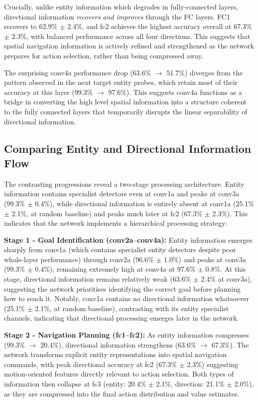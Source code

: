Crucially, unlike entity information which degrades in fully-connected layers, directional information \textit{recovers and improves} through the FC layers. FC1 recovers to 62.9\% $\pm$ 2.4\%, and fc2 achieves the highest accuracy overall at 67.3\% $\pm$ 2.3\%, with balanced performance across all four directions. This suggests that spatial navigation information is actively refined and strengthened as the network prepares for action selection, rather than being compressed away.

The surprising conv4a performance drop (63.6\% $\rightarrow$ 51.7\%) diverges from the pattern observed in the next target entity probes, which retain most of their accuracy at this layer (99.3\% $\rightarrow$ 97.6\%). This suggests conv4a functions as a bridge in converting the high level spatial information into a structure coherent to the fully connected layers that temporarily disrupts the linear separability of directional information.

\subsection{Comparing Entity and Directional Information Flow}

The contrasting progressions reveal a two-stage processing architecture. Entity information contains specialist detectors even at conv1a and peaks at conv3a (99.3\% $\pm$ 0.4\%), while directional information is entirely absent at conv1a (25.1\% $\pm$ 2.1\%, at random baseline) and peaks much later at fc2 (67.3\% $\pm$ 2.3\%). This indicates that the network implements a hierarchical processing strategy:

\textbf{Stage 1 - Goal Identification (conv2a--conv4a):} Entity information emerges sharply from conv1a (which contains specialist entity detectors despite poor whole-layer performance) through conv2a (96.6\% $\pm$ 1.0\%) and peaks at conv3a (99.3\% $\pm$ 0.4\%), remaining extremely high at conv4a at 97.6\% $\pm$ 0.8\%. At this stage, directional information remains relatively weak (63.6\% $\pm$ 2.4\% at conv3a), suggesting the network prioritises identifying the correct goal before planning how to reach it. Notably, conv1a contains no directional information whatsoever (25.1\% $\pm$ 2.1\%, at random baseline), contrasting with its entity specialist channels, indicating that directional processing emerges later in the network.

\textbf{Stage 2 - Navigation Planning (fc1--fc2):} As entity information compresses (99.3\% $\rightarrow$ 20.4\%), directional information strengthens (63.6\% $\rightarrow$ 67.3\%). The network transforms explicit entity representations into spatial navigation commands, with peak directional accuracy at fc2 (67.3\% $\pm$ 2.3\%) suggesting motion-oriented features directly relevant to action selection. Both types of information then collapse at fc3 (entity: 20.4\% $\pm$ 2.1\%, direction: 21.1\% $\pm$ 2.0\%), as they are compressed into the final action distribution and value estimates.

